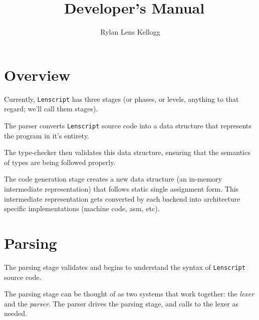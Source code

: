 \documentclass[12pt]{report}
\title  {\langname\ Developer's Manual}
\author {Rylan Lens Kellogg}
\newcommand{\langname}{Lenscript}
\newcommand{\lang}{\texttt{\langname} }
\begin{document}
\pagestyle{fancy}
\renewcommand{\chaptermark}[1]{\markboth{#1}{#1}}
\fancyhf{}
\fancyhead[C]{\leftmark}
\fancyfoot[C]{\thepage}

\hypersetup{pageanchor=false}
\begin{titlepage}
  \maketitle
\end{titlepage}

\chapter{Overview}
\label{ch:Overview}

Currently, \lang has three stages (or phases, or levels, anything to that regard; we'll call them stages).

\begin{center}
\end{center}

The parser converts \lang source code into a data structure that represents the program in it's entirety.

The type-checker then validates this data structure, ensuring that the semantics of types are being followed properly.

The code generation stage creates a new data structure (an in-memory intermediate representation) that follows static single assignment form.
This intermediate representation gets converted by each backend into
architecture specific implementations (machine code, asm, etc).

\chapter{Parsing}
\label{ch:parsing}

The parsing stage validates and begins to understand the syntax of \lang source code.

The parsing stage can be thought of as two systems that work together: the \emph{lexer} and the \emph{parser}. The parser drives the parsing stage, and calls to the lexer as needed.
\end{document}
